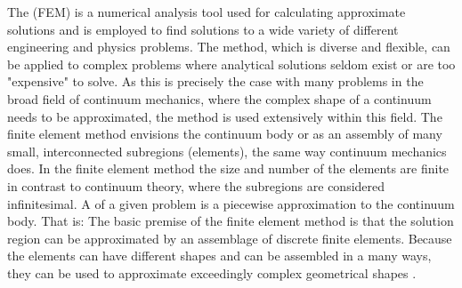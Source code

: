 
\label{sec:finite_element_method}
The  (FEM) is a numerical analysis tool
used for calculating approximate solutions and is employed to find
solutions to a wide variety of different engineering and physics
problems.
%
The method, which is diverse and flexible, can be applied to complex
problems where analytical solutions seldom exist or are too "expensive"
to solve. As this is precisely the case with many problems in the broad
field of continuum mechanics, where the complex shape of a continuum
needs to be approximated, the method is used extensively within this
field.
%
The finite element method envisions the continuum body or
 as an assembly of many small,
interconnected subregions (elements), the same way continuum mechanics
does.
In the finite element method the size and number of the elements are
finite in contrast to continuum theory, where the subregions are
considered infinitesimal.
A  of a given problem is a
piecewise approximation to the continuum body. That is: The basic
premise of the finite element method is that the solution
region can be approximated by an assemblage of discrete finite
elements. Because the elements can have different shapes and can be
assembled in a many ways, they can be used to approximate exceedingly
complex geometrical shapes .

